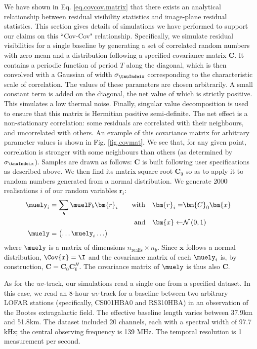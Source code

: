 \pg
We have shown in Eq. \ref{eq.covcov.matrix} that there exists an analytical relationship between residual visibility statistics and image-plane residual statistics. This section gives details of simulations we have performed to support our claims on this ``Cov-Cov" relationship. Specifically, we simulate residual visibilities for a single baseline by generating a set of correlated random numbers with zero mean and a distribution following a specified covariance matrix $\bm{C}$. 
It contains a periodic function of period $T$ along the diagonal, which is then convolved with a Gaussian of width $\sigma_\tnuIndeix$ corresponding to the characteristic scale of correlation. The values of these parameters are chosen arbitrarily. A small constant term is added on the diagonal, the net value of which is strictly positive. This simulates a low thermal noise. Finally, singular value decomposition is used to ensure that this matrix is Hermitian positive semi-definite. The net effect is a {non-stationary} correlation: some residuals are correlated with their neighbours, and uncorrelated with others. An example of this covariance matrix for arbitrary parameter values is shown in Fig. \ref{fig.covmat}. We see that, for any given point, correlation is stronger with some neighbours than others (as determined by $\sigma_\tnuIndeix$).
Samples are drawn as follows: $\bm{C}$ is built following user specifications as described above. We then find its matrix square root $\bm{C}_0$ so as to apply it to random numbers generated from a normal distribution. We generate 2000 realisations $i$ of our random variables $\bm{r}_i$: 
\begin{alignat}{2}
\muely_i &= \sum_b \muelF_b \bm{r}_i \quad &\mathrm{with} \quad \bm{r}_i =& \bm{C}_0 \bm{x}\\
         &                                 &\mathrm{and} \quad \bm{x} \leftarrow& \mathcal{N}\left(0,1\right)\\
\muely   &= \begin{pmatrix} \hdots \muely_i \hdots \end{pmatrix}
\end{alignat}
{where $\muely$ is a matrix of dimensions $n_{\mathrm{realis}}\times n_b$. Since $\bm{x}$ follows a normal distribution, $\Cov{x}=\I$ and the covariance matrix of each $\muely_i$ is, by construction, $\bm{C}=\bm{C}_0 \bm{C}_0^H$. The covariance matrix of $\muely$ is thus also $\bm{C}$.}


\pg
As for the $uv$-track, our simulations read a single one from a specified dataset. In this case, we read an 8-hour $uv$-track for a baseline between two arbitrary LOFAR stations (specifically, CS001HBA0 and RS310HBA) in an observation of the Bootes extragalactic field. The effective baseline length varies between 37.9km and 51.8km. The dataset included 20 channels, each with a spectral width of 97.7 kHz; the central observing frequency is 139 MHz. The temporal resolution is 1 measurement per second.

